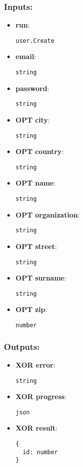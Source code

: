 \subsubsection*{Inputs:}
\begin{itemize}
  \small
    \item \textbf{run}: 
\begin{lstlisting}
user.Create
\end{lstlisting}
    \item \textbf{email}: 
\begin{lstlisting}
string
\end{lstlisting}
    \item \textbf{password}: 
\begin{lstlisting}
string
\end{lstlisting}
    \item \textbf{OPT city}: 
\begin{lstlisting}
string
\end{lstlisting}
    \item \textbf{OPT country}: 
\begin{lstlisting}
string
\end{lstlisting}
    \item \textbf{OPT name}: 
\begin{lstlisting}
string
\end{lstlisting}
    \item \textbf{OPT organization}: 
\begin{lstlisting}
string
\end{lstlisting}
    \item \textbf{OPT street}: 
\begin{lstlisting}
string
\end{lstlisting}
    \item \textbf{OPT surname}: 
\begin{lstlisting}
string
\end{lstlisting}
    \item \textbf{OPT zip}: 
\begin{lstlisting}
number
\end{lstlisting}
  \end{itemize}
\subsubsection*{Outputs:}
\begin{itemize}
  \small
    \item \textbf{XOR error}: 
\begin{lstlisting}
string
\end{lstlisting}
    \item \textbf{XOR progress}: 
\begin{lstlisting}
json
\end{lstlisting}
    \item \textbf{XOR result}: 
\begin{lstlisting}
{
  id: number
}
\end{lstlisting}
  \end{itemize}


